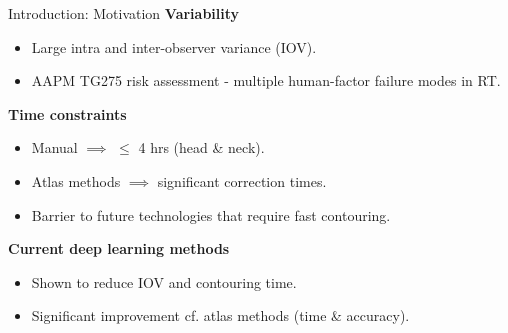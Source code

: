 \documentclass[9pt]{beamer}
\begin{document}
\begin{frame}{Introduction: Motivation}
\textbf{Variability}
\begin{itemize}
\item Large intra and inter-observer variance (IOV).\footnotemark[1]
\item  AAPM TG275 risk assessment - multiple human-factor failure modes in RT.\footnotemark[2]
\end{itemize}

\textbf{Time constraints}
\begin{itemize}
	\item Manual $\implies$  $\leq$ 4 hrs (head \& neck).\footnotemark[3]
	\item Atlas methods $\implies$ significant correction times.\footnotemark[4]
	\item Barrier to future technologies that require fast contouring.\footnotemark[4]
\end{itemize}

\textbf{Current deep learning methods}
\begin{itemize}
	\item Shown to reduce IOV and contouring time.\footnotemark[4]
	\item Significant improvement cf. atlas methods (time \& accuracy).\footnotemark[3]
\end{itemize}
\end{frame}
%
\end{document}
